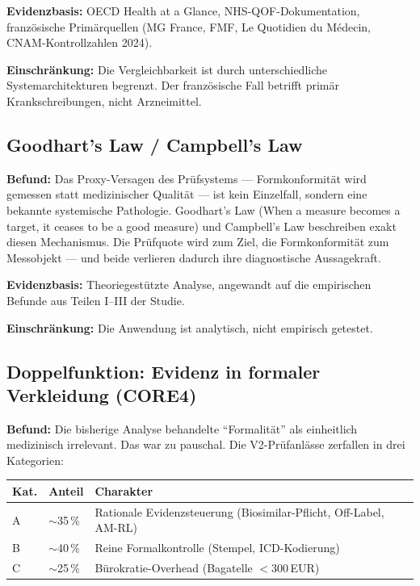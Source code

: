 \documentclass{umbruch-position}
\begin{document}
\textbf{Evidenzbasis:} OECD Health at a Glance, NHS-QOF-Dokumentation, franz\"osische Prim\"arquellen (MG France, FMF, Le Quotidien du M\'edecin, CNAM-Kontrollzahlen 2024).

\textbf{Einschr\"ankung:} Die Vergleichbarkeit ist durch unterschiedliche Systemarchitekturen begrenzt. Der franz\"osische Fall betrifft prim\"ar Krankschreibungen, nicht Arzneimittel.

\subsection{Goodhart's Law / Campbell's Law}

\textbf{Befund:} Das Proxy-Versagen des Pr\"ufsystems --- Formkonformit\"at wird gemessen statt medizinischer Qualit\"at --- ist kein Einzelfall, sondern eine bekannte systemische Pathologie. Goodhart's Law (\glqq{}When a measure becomes a target, it ceases to be a good measure\grqq{}) und Campbell's Law beschreiben exakt diesen Mechanismus. Die Pr\"ufquote wird zum Ziel, die Formkonformit\"at zum Messobjekt --- und beide verlieren dadurch ihre diagnostische Aussagekraft.

\textbf{Evidenzbasis:} Theoriegest\"utzte Analyse, angewandt auf die empirischen Befunde aus Teilen I--III der Studie.

\textbf{Einschr\"ankung:} Die Anwendung ist analytisch, nicht empirisch getestet.

\subsection{Doppelfunktion: Evidenz in formaler Verkleidung (CORE4)}

\textbf{Befund:} Die bisherige Analyse behandelte ``Formalit\"at'' als einheitlich medizinisch irrelevant. Das war zu pauschal. Die V2-Pr\"ufanl\"asse zerfallen in drei Kategorien:

\smallskip
{\small
\begin{tabularx}{\textwidth}{l l X}
\hline
\textbf{Kat.} & \textbf{Anteil} & \textbf{Charakter} \\
\hline
A & ${\sim}$35\,\% & Rationale Evidenzsteuerung (Biosimilar-Pflicht, Off-Label, AM-RL) \\
B & ${\sim}$40\,\% & Reine Formalkontrolle (Stempel, ICD-Kodierung) \\
C & ${\sim}$25\,\% & B\"urokratie-Overhead (Bagatelle ${<}$300\,EUR) \\
\hline
\end{tabularx}
}
\smallskip
\end{document}
